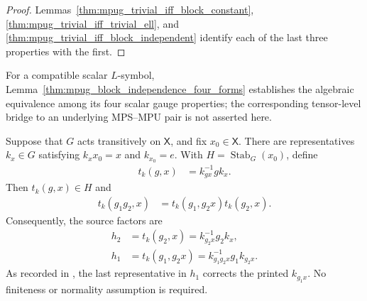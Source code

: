 \begin{proof}\leanok
    Lemmas~\ref{thm:mpug_trivial_iff_block_constant},
    \ref{thm:mpug_trivial_iff_trivial_ell}, and
    \ref{thm:mpug_trivial_iff_block_independent} identify each of the last
    three properties with the first.
\end{proof}

For a compatible scalar $L$-symbol,
Lemma~\ref{thm:mpug_block_independence_four_forms} establishes the
algebraic equivalence among its four scalar gauge properties; the corresponding
tensor-level bridge to an underlying MPS--MPU pair is not asserted here.

\begin{lemma}
    \label{thm:mpug_stabilizer_transition}
    \leanok
    Suppose that $G$ acts transitively on $\mathsf X$, and fix
    $x_0\in\mathsf X$. There are representatives $k_x\in G$ satisfying
    $k_xx_0=x$ and $k_{x_0}=e$. With
    $H=\operatorname{Stab}_G(x_0)$, define
    \begin{align}
        t_k(g,x)
         & =k_{g x}^{-1}gk_x.
        \label{eq:mpug_stabilizer_transition}
    \end{align}
    Then $t_k(g,x)\in H$ and
    \begin{align}
        t_k(g_1g_2,x)
         & =t_k(g_1,g_2x)t_k(g_2,x).
        \label{eq:mpug_stabilizer_transition_product}
    \end{align}
    Consequently, the source factors are
    \begin{align}
        h_2
         & =t_k(g_2,x)=k_{g_2x}^{-1}g_2k_x,
        \label{eq:mpug_stabilizer_h2}                  \\
        h_1
         & =t_k(g_1,g_2x)=k_{g_1g_2x}^{-1}g_1k_{g_2x}.
        \label{eq:mpug_stabilizer_h1}
    \end{align}
    As recorded in \cite{gap:fbc25_stabilizer_transition_index_typo}, the last
    representative in $h_1$ corrects the printed $k_{g_1x}$. No finiteness or
    normality assumption is required.
\end{lemma}


